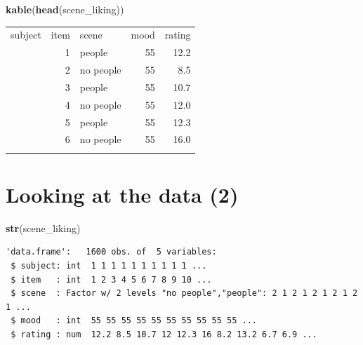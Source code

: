 \documentclass[]{article}
\newenvironment{Shaded}{}{}
\newcommand{\KeywordTok}[1]{\textcolor[rgb]{0.00,0.44,0.13}{\textbf{{#1}}}}
\newcommand{\StringTok}[1]{\textcolor[rgb]{0.25,0.44,0.63}{{#1}}}
\newcommand{\CommentTok}[1]{\textcolor[rgb]{0.38,0.63,0.69}{\textit{{#1}}}}
\newcommand{\NormalTok}[1]{{#1}}
\begin{document}
\begin{Shaded}
\begin{Highlighting}[]
\KeywordTok{kable}\NormalTok{(}\KeywordTok{head}\NormalTok{(scene_liking))}
\end{Highlighting}
\end{Shaded}

\begin{longtable}[c]{@{}rrlrr@{}}
\toprule\addlinespace
subject & item & scene & mood & rating
\\\addlinespace
\midrule\endhead
1 & 1 & people & 55 & 12.2
\\\addlinespace
1 & 2 & no people & 55 & 8.5
\\\addlinespace
1 & 3 & people & 55 & 10.7
\\\addlinespace
1 & 4 & no people & 55 & 12.0
\\\addlinespace
1 & 5 & people & 55 & 12.3
\\\addlinespace
1 & 6 & no people & 55 & 16.0
\\\addlinespace
\bottomrule
\end{longtable}

\section{Looking at the data (2)}\label{looking-at-the-data-2}

\begin{Shaded}
\begin{Highlighting}[]
\KeywordTok{str}\NormalTok{(scene_liking)}
\end{Highlighting}
\end{Shaded}

\begin{verbatim}
'data.frame':   1600 obs. of  5 variables:
 $ subject: int  1 1 1 1 1 1 1 1 1 1 ...
 $ item   : int  1 2 3 4 5 6 7 8 9 10 ...
 $ scene  : Factor w/ 2 levels "no people","people": 2 1 2 1 2 1 2 1 2 1 ...
 $ mood   : int  55 55 55 55 55 55 55 55 55 55 ...
 $ rating : num  12.2 8.5 10.7 12 12.3 16 8.2 13.2 6.7 6.9 ...
\end{verbatim}

\begin{Shaded}
\end{Shaded}
\end{document}
